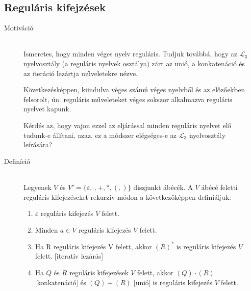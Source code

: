 \documentclass[margin=0px]{article}
\begin{document}
\subsection{Reguláris kifejzések}
\begin{description}
    \item[Motiváció] \hfill \\
        Ismeretes, hogy minden véges nyelv reguláris. Tudjuk továbbá, hogy az $\mathcal{L}_3$ nyelvosztály (a reguláris nyelvek osztálya) zárt az unió, a konkatenáció és az iteráció lezártja műveletekre nézve.

        Következésképpen, kiindulva véges számú véges nyelvből és az előzőekben felsorolt, ún. reguláris műveleteket véges sokszor alkalmazva reguláris nyelvet kapunk.

        Kérdés az, hogy vajon ezzel az eljárással minden reguláris nyelvet
        elő tudunk-e állítani, azaz, ez a módszer elégséges-e az $\mathcal{L}_3$ nyelvosztály leírására?
    \item[Definíció] \hfill \\
        Legyenek $V$ és $V' = \{\varepsilon, \cdot, +, *, (, )\}$ diszjunkt ábécék. A $V$ ábécé feletti reguláris kifejezéseket rekurzív módon a következőképpen definiáljuk:
        \begin{enumerate}
            \item $\varepsilon$ reguláris kifejezés $V$ felett.
            \item Minden $a \in V$ reguláris kifejezés $V$ felett.
            \item Ha R reguláris kifejezés V felett, akkor $(R)^*$ is reguláris kifejezés $V$ felett. [iteratív lezárás]
            \item Ha $Q$ és $R$ reguláris kifejezések $V$ felett, akkor $(Q) \cdot (R)$ [konkatenáció] és $(Q) + (R)$ [unió] is reguláris kifejezés $V$ felett.
        \end{enumerate}


\end{description}
\end{document}
